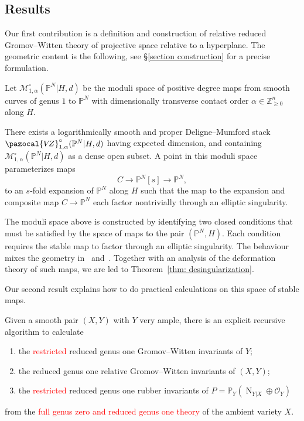 \documentclass[11pt]{amsart}
\newcommand{\tred}{\textcolor{red}}
\newcommand{\PP}{\mathbb P}
\newcommand{\VZ}{\pazocal{V\!Z}}
\newcommand{\OO}{\mathcal{O}}
\renewcommand{\to}{\rightarrow}
\theoremstyle{definition}
\newenvironment{customthm}[1]
  {\renewcommand\theinnercustomthm{#1}\innercustomthm}
  {\endinnercustomthm}
\theoremstyle{definition}
\begin{document}
\subsection{Results} Our first contribution is a definition and construction of relative reduced Gromov--Witten theory of projective space relative to a hyperplane. The geometric content is the following, see \S \ref{section construction} for a precise formulation.

Let $\mathcal M_{1,\alpha}^\circ(\mathbb P^N|H,d)$ be the moduli space of positive degree maps from smooth curves of genus $1$ to $\mathbb P^N$ with dimensionally transverse contact order $\alpha\in\mathbb Z^n_{\geq 0}$ along $H$. 

\begin{customthm}{A}\label{thm: desingularization}
There exists a logarithmically smooth and proper Deligne--Mumford stack $\VZ_{1,\alpha}^\circ(\mathbb P^N|H,d)$ having expected dimension, and containing $\mathcal M_{1,\alpha}^\circ(\mathbb P^N|H,d)$  as a dense open subset. A point in this moduli space parameterizes maps
\[
C\to \mathbb P^N[s]\to \mathbb P^N,
\]
to an $s$-fold expansion of $\mathbb P^N$ along $H$ such that the map to the expansion and composite map $C\to \mathbb P^N$ each factor nontrivially through an elliptic singularity. 
\end{customthm}

The moduli space above is constructed by identifying two closed conditions that must be satisfied by the space of maps to the pair $(\mathbb P^N,H)$. Each condition requires the stable map to factor through an elliptic singularity. The behaviour mixes the geometry in~\cite{RSPW} and~\cite{RSPW2}. {Together with an analysis of the deformation theory of such maps, we are led to Theorem~\ref{thm: desingularization}}.

Our second result explains how to do practical calculations on this space of stable maps. 

\begin{customthm}{B}\label{thm: recursion}
Given a smooth pair $(X,Y)$ with $Y$ very ample, there is an explicit recursive algorithm to calculate
\begin{enumerate}
\item the \tred{restricted} reduced genus one Gromov--Witten invariants of $Y$;
\item the reduced genus one relative Gromov--Witten invariants of $(X,Y)$; 
\item the \tred{restricted} reduced genus one rubber invariants of $P=\PP_Y(\operatorname{N}_{Y|X} \oplus \OO_Y)$
\end{enumerate}
from the \tred{full genus zero and reduced genus one theory} of the ambient variety $X$.
\end{customthm}
\end{document}
